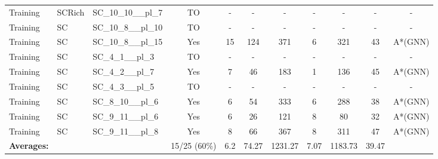 \documentclass{article}
\begin{document}
\begin{tabular}{lllcccccccc}
Training & SCRich & SC\_10\_10\_\_pl\_7 & TO & - & - & - & - & - & - & - \\
Training & SC & SC\_10\_8\_\_pl\_10 & TO & - & - & - & - & - & - & - \\
Training & SC & SC\_10\_8\_\_pl\_15 & Yes & 15 & 124 & 371 & 6 & 321 & 43 & A*(GNN) \\
Training & SC & SC\_4\_1\_\_pl\_3 & TO & - & - & - & - & - & - & - \\
Training & SC & SC\_4\_2\_\_pl\_7 & Yes & 7 & 46 & 183 & 1 & 136 & 45 & A*(GNN) \\
Training & SC & SC\_4\_3\_\_pl\_5 & TO & - & - & - & - & - & - & - \\
Training & SC & SC\_8\_10\_\_pl\_6 & Yes & 6 & 54 & 333 & 6 & 288 & 38 & A*(GNN) \\
Training & SC & SC\_9\_11\_\_pl\_6 & Yes & 6 & 26 & 121 & 8 & 80 & 32 & A*(GNN) \\
Training & SC & SC\_9\_11\_\_pl\_8 & Yes & 8 & 66 & 367 & 8 & 311 & 47 & A*(GNN) \\
\textbf{Averages:} & & & 15/25 (60\%) & 6.2 & 74.27 & 1231.27 & 7.07 & 1183.73 & 39.47 & \\
\bottomrule
\end{tabular}
\newpage
\end{document}
